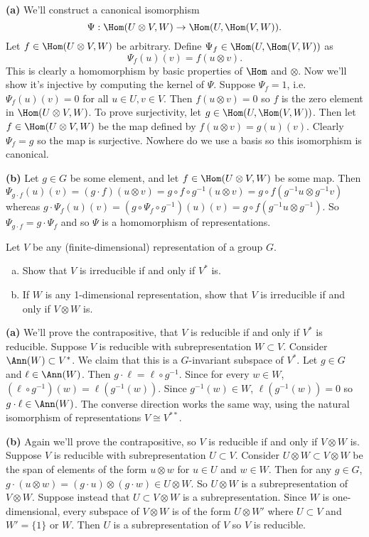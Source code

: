 \documentclass[11pt,letterpaper]{article}
\begin{document}
\textbf{(a)} We'll construct a canonical isomorphism 
\[
    \Psi : \Hom(U\otimes V, W) \to \Hom(U, \Hom(V,W)) 
.\] 
Let $f\in\Hom(U\otimes V, W)$ be arbitrary. Define $\Psi_f\in \Hom(U, \Hom(V, W))$ as 
\[
    \Psi_f(u)(v) = f(u\otimes v)
.\] 
This is clearly a homomorphism by basic properties of $\Hom$ and $\otimes$. Now we'll show it's injective by computing the kernel of $\Psi$. Suppose $\Psi_f=1$, i.e. $\Psi_f(u)(v)=0$ for all $u\in U, v\in V$. Then $f(u\otimes v)=0$ so $f$ is the zero element in $\Hom(U\otimes V, W)$. To prove surjectivity, let $g\in \Hom(U, \Hom(V, W))$. Then let $f\in \Hom(U\otimes V, W)$ be the map defined by $f(u\otimes v)=g(u)(v)$. Clearly $\Psi_f=g$ so the map is surjective. Nowhere do we use a basis so this isomorphism is canonical.

\textbf{(b)} Let $g\in G$ be some element, and let $f\in \Hom(U\otimes V, W)$ be some map. Then $\Psi_{g\cdot f}(u)(v) = (g\cdot f)(u\otimes v)=g\circ f\circ g^{-1}(u\otimes v)=g\circ f(g^{-1}u\otimes g^{-1}v)$ whereas $g\cdot \Psi_{f}(u)(v) = (g\circ \Psi_f\circ g^{-1})(u)(v)=g\circ f(g^{-1}u\otimes g^{-1})$. So $\Psi_{g\cdot f}=g\cdot \Psi_f$ and so $\Psi$ is a homomorphism of representations.

\pagebreak
\begin{problem}
    Let $V$ be any (finite-dimensional) representation of a group $G$.
    \begin{enumerate}[(a)]
        \item Show that $V$ is irreducible if and only if $V^*$ is.
        \item If $W$ is any 1-dimensional representation, show that $V$ is irreducible if and only if $V \otimes W$ is.
    \end{enumerate}
\end{problem}

\textbf{(a)} We'll prove the contrapositive, that $V$ is reducible if and only if $V^*$ is reducible. Suppose $V$ is reducible with subrepresentation $W\subset V$. Consider $\Ann(W)\subset V^*$. We claim that this is a $G$-invariant subspace of $V^*$. Let $g\in G$ and $\ell\in \Ann(W)$. Then $g\cdot \ell=\ell\circ g^{-1}$. Since for every $w\in W$, $(\ell\circ g^{-1})(w)=\ell(g^{-1}(w))$. Since $g^{-1}(w)\in W$, $\ell(g^{-1}(w))=0$ so $g\cdot \ell \in \Ann(W)$. The converse direction works the same way, using the natural isomorphism of representations $V\cong V^{**}$.

\textbf{(b)} Again we'll prove the contrapositive, so $V$ is reducible if and only if $V\otimes W$ is. Suppose $V$ is reducible with subrepresentation $U\subset V$. Consider $U\otimes W\subset V\otimes W$ be the span of elements of the form $u\otimes w$ for $u\in U$ and $w\in W$. Then for any $g\in G$, $g\cdot (u\otimes w)=(g\cdot u)\otimes (g\cdot w)\in U\otimes W$. So $U\otimes W$ is a subrepresentation of $V\otimes W$. Suppose instead that $U\subset V\otimes W$ is a subrepresentation. Since $W$ is one-dimensional, every subspace of $V\otimes W$ is of the form $U\otimes W'$ where $U\subset V$ and $W'=\{1\}$ or $W$. Then $U$ is a subrepresentation of $V$ so $V$ is reducible.
\end{document}
